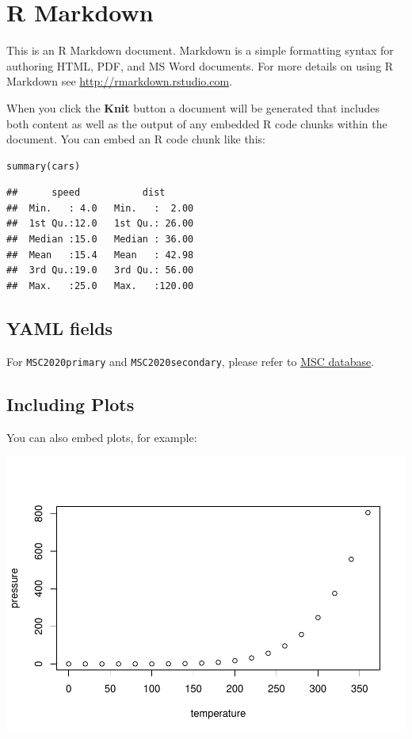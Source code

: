 \documentclass[ba]{imsart}
\numberwithin{equation}{section}
\theoremstyle{plain}
\begin{document}
\hypertarget{r-markdown}{%
\section{R Markdown}\label{r-markdown}}

This is an R Markdown document. Markdown is a simple formatting syntax for authoring HTML, PDF, and MS Word documents. For more details on using R Markdown see \url{http://rmarkdown.rstudio.com}.

When you click the \textbf{Knit} button a document will be generated that includes both content as well as the output of any embedded R code chunks within the document. You can embed an R code chunk like this:

\begin{verbatim}
summary(cars)
\end{verbatim}

\begin{verbatim}
##      speed           dist       
##  Min.   : 4.0   Min.   :  2.00  
##  1st Qu.:12.0   1st Qu.: 26.00  
##  Median :15.0   Median : 36.00  
##  Mean   :15.4   Mean   : 42.98  
##  3rd Qu.:19.0   3rd Qu.: 56.00  
##  Max.   :25.0   Max.   :120.00
\end{verbatim}

\hypertarget{yaml-fields}{%
\subsection{YAML fields}\label{yaml-fields}}

For \texttt{MSC2020primary} and \texttt{MSC2020secondary}, please refer to \href{https://mathscinet.ams.org/mathscinet/msc/msc2020.html}{MSC database}.

\hypertarget{including-plots}{%
\subsection{Including Plots}\label{including-plots}}

You can also embed plots, for example:

\includegraphics{template-bayesiana_files/figure-latex/pressure-1.pdf}
\end{document}

